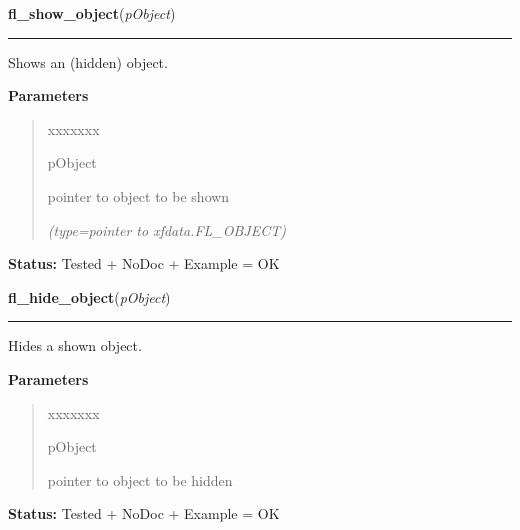 \hspace{.8\funcindent}\begin{boxedminipage}{\funcwidth}

    \raggedright \textbf{fl\_show\_object}(\textit{pObject})

    \vspace{-1.5ex}

    \rule{\textwidth}{0.5\fboxrule}
\setlength{\parskip}{2ex}
    Shows an (hidden) object.

\setlength{\parskip}{1ex}
      \textbf{Parameters}
      \vspace{-1ex}

      \begin{quote}
        \begin{Ventry}{xxxxxxx}

          \item[pObject]

          pointer to object to be shown

            {\it (type=pointer to xfdata.FL\_OBJECT)}

        \end{Ventry}

      \end{quote}

\textbf{Status:} Tested + NoDoc + Example = OK



    \end{boxedminipage}

    \label{xformslib:library:fl_hide_object}

    \vspace{0.5ex}

\hspace{.8\funcindent}\begin{boxedminipage}{\funcwidth}

    \raggedright \textbf{fl\_hide\_object}(\textit{pObject})

    \vspace{-1.5ex}

    \rule{\textwidth}{0.5\fboxrule}
\setlength{\parskip}{2ex}
    Hides a shown object.

\setlength{\parskip}{1ex}
      \textbf{Parameters}
      \vspace{-1ex}

      \begin{quote}
        \begin{Ventry}{xxxxxxx}

          \item[pObject]

          pointer to object to be hidden

        \end{Ventry}

      \end{quote}

\textbf{Status:} Tested + NoDoc + Example = OK



    \end{boxedminipage}


